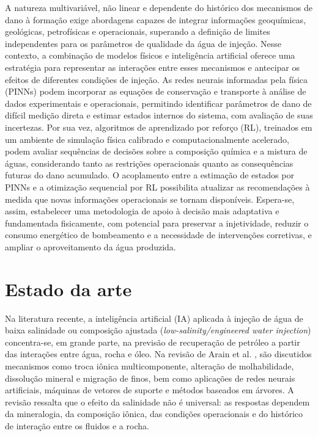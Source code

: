 \documentclass[10pt,a4paper]{article}
\newcommand{\itemedital}[1]{}
\begin{document}
A natureza multivariável, não linear e dependente do histórico dos mecanismos de dano à formação exige abordagens capazes de integrar informações geoquímicas, geológicas, petrofísicas e operacionais, superando a definição de limites independentes para os parâmetros de qualidade da água de injeção. Nesse contexto, a combinação de modelos físicos e inteligência artificial oferece uma estratégia para representar as interações entre esses mecanismos e antecipar os efeitos de diferentes condições de injeção. As redes neurais informadas pela física (PINNs) podem incorporar as equações de conservação e transporte à análise de dados experimentais e operacionais, permitindo identificar parâmetros de dano de difícil medição direta e estimar estados internos do sistema, com avaliação de suas incertezas. Por sua vez, algoritmos de aprendizado por reforço (RL), treinados em um ambiente de simulação física calibrado e computacionalmente acelerado, podem avaliar sequências de decisões sobre a composição química e a mistura de águas, considerando tanto as restrições operacionais quanto as consequências futuras do dano acumulado. O acoplamento entre a estimação de estados por PINNs e a otimização sequencial por RL possibilita atualizar as recomendações à medida que novas informações operacionais se tornam disponíveis. Espera-se, assim, estabelecer uma metodologia de apoio à decisão mais adaptativa e fundamentada fisicamente, com potencial para preservar a injetividade, reduzir o consumo energético de bombeamento e a necessidade de intervenções corretivas, e ampliar o aproveitamento da água produzida.



\section{Estado da arte}\itemedital{2.16 IX}

Na literatura recente, a inteligência artificial (IA) aplicada à injeção de água de baixa salinidade ou composição ajustada (\textit{low-salinity/engineered water injection}) concentra-se, em grande parte, na previsão de recuperação de petróleo a partir das interações entre água, rocha e óleo. Na revisão de Arain et al. \cite{arain2026review}, são discutidos mecanismos como troca iônica multicomponente, alteração de molhabilidade, dissolução mineral e migração de finos, bem como aplicações de redes neurais artificiais, máquinas de vetores de suporte e métodos baseados em árvores. A revisão ressalta que o efeito da salinidade não é universal: as respostas dependem da mineralogia, da composição iônica, das condições operacionais e do histórico de interação entre os fluidos e a rocha.
\end{document}
